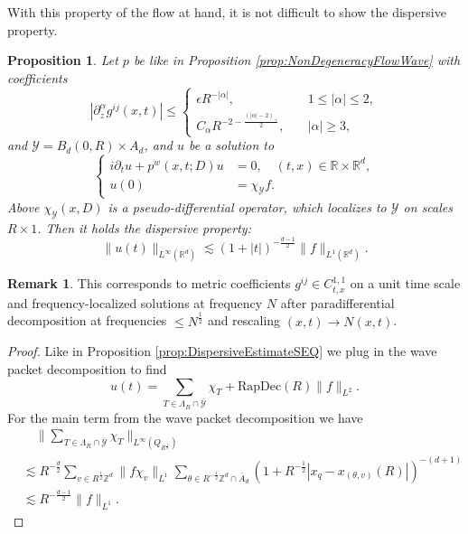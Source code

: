 \documentclass{amsart}
\newtheorem{proposition}[theorem]{Proposition}
\theoremstyle{definition}
\newtheorem{remark}[theorem]{Remark}
\newcommand{\R}{\mathbb{R}}
\newcommand{\Z}{\mathbb{Z}}
\begin{document}
With this property of the flow at hand, it is not difficult to show the dispersive property.
\begin{proposition}
\label{prop:DispersiveEstimateWave}
Let $p$ be like in Proposition \ref{prop:NonDegeneracyFlowWave} with coefficients
\begin{equation*}
|\partial_z^{\alpha} g^{ij}(x,t)| \leq 
\begin{cases}
\epsilon R^{-|\alpha|}, &\quad 1 \leq |\alpha| \leq 2, \\
C_\alpha R^{-2 - \frac{(|\alpha|-2)_+}{2}}, &\quad |\alpha| \geq 3,
\end{cases}
\end{equation*}
and $\mathcal{Y} = B_d(0,R) \times A_d$, and $u$ be a solution to
\begin{equation*}
\left\{ \begin{array}{cl}
i \partial_t u + p^w(x,t;D) u &= 0, \quad (t,x) \in \R \times \R^d, \\
u(0) &= \chi_{\mathcal{Y}} f.
\end{array} \right.
\end{equation*}
Above $\chi_{\mathcal{Y}}(x,D)$ is a pseudo-differential operator, which localizes to $\mathcal{Y}$ on scales $R \times 1$. Then it holds the dispersive property:
\begin{equation*}
\| u(t) \|_{L^\infty(\R^d)} \lesssim (1+|t|)^{-\frac{d-1}{2}} \| f \|_{L^1(\R^d)}.
\end{equation*}
\end{proposition}
\begin{remark}
This corresponds to metric coefficients $g^{ij} \in C^{1,1}_{t,x}$ on a unit time scale and frequency-localized solutions at frequency $N$ after paradifferential decomposition at frequencies $\leq N^{\frac{1}{2}}$ and rescaling $(x,t) \to N(x,t)$.
\end{remark}

\begin{proof}
Like in Proposition \ref{prop:DispersiveEstimateSEQ} we plug in the wave packet decomposition to find
\begin{equation*}
u(t) = \sum_{T \in \Lambda_R \cap \overline{\mathcal{Y}}} \chi_T + \text{RapDec}(R) \| f \|_{L^2}.
\end{equation*}
For the main term from the wave packet decomposition we have
\begin{equation*}
\begin{split}
&\quad \big\| \sum_{T \in \Lambda_R \cap \overline{\mathcal{Y}}} \chi_T \big\|_{L^\infty(Q_{R^{\frac{1}{2}}})} \\
 &\lesssim R^{-\frac{d}{2}} \sum_{v \in R^{\frac{1}{2}} \Z^d} \| f \chi_v \|_{L^1} \sum_{\theta \in R^{-\frac{1}{2}} \Z^d \cap \bar{A}_d} (1 + R^{-\frac{1}{2}} | x_q - x_{(\theta,v)}(R)|)^{-(d+1)} \\
&\lesssim R^{-\frac{d-1}{2}} \| f \|_{L^1}.
\end{split}
\end{equation*}
\end{proof}
\end{document}
